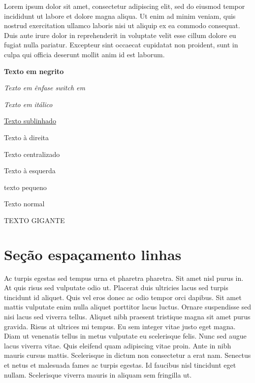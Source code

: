 \documentclass[12pt]{article}
\begin{document}
		Lorem ipsum dolor sit amet, consectetur adipiscing elit, sed do eiusmod tempor incididunt ut labore et dolore magna aliqua. Ut enim ad minim veniam, quis nostrud exercitation ullamco laboris nisi ut aliquip ex ea commodo consequat. Duis aute irure dolor in reprehenderit in voluptate velit esse cillum dolore eu fugiat nulla pariatur. Excepteur sint occaecat cupidatat non proident, sunt in culpa qui officia deserunt mollit anim id est laborum.
		\newpage %

	\textbf{Texto em negrito}
	
	{\em Texto em ênfase switch em}
	
	\textit{Texto em itálico}
	
	\underline{Texto sublinhado}
	
	\begin{flushright}
		Texto à direita
	\end{flushright}
	
	\begin{center}
		Texto centralizado
	\end{center}
	
	\begin{flushleft}
		Texto à esquerda
	\end{flushleft}
	
	\begin{tiny}
		texto pequeno
	\end{tiny}
	
	Texto normal
	
	{\Huge TEXTO GIGANTE}
	
	\newpage
	
	\section{Seção espaçamento linhas}
		\doublespacing %
		Ac turpis egestas sed tempus urna et pharetra pharetra. Sit amet nisl purus in. At quis risus sed vulputate odio ut. Placerat duis ultricies lacus sed turpis tincidunt id aliquet. Quis vel eros donec ac odio tempor orci dapibus. Sit amet mattis vulputate enim nulla aliquet porttitor lacus luctus. Ornare suspendisse sed nisi lacus sed viverra tellus. Aliquet nibh praesent tristique magna sit amet purus gravida. Risus at ultrices mi tempus. Eu sem integer vitae justo eget magna. Diam ut venenatis tellus in metus vulputate eu scelerisque felis. Nunc sed augue lacus viverra vitae. Quis eleifend quam adipiscing vitae proin. Ante in nibh mauris cursus mattis. Scelerisque in dictum non consectetur a erat nam. Senectus et netus et malesuada fames ac turpis egestas. Id faucibus nisl tincidunt eget nullam. Scelerisque viverra mauris in aliquam sem fringilla ut.
		
\end{document}
